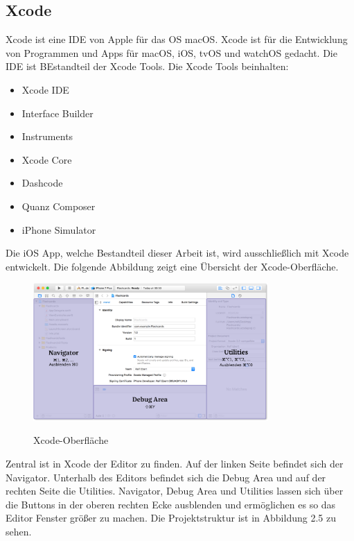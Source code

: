 \subsection{Xcode}
Xcode ist eine \acl{IDE} von Apple für das \acs{OS} macOS. Xcode ist für die Entwicklung von Programmen und Apps für macOS, iOS, tvOS und watchOS gedacht. 
Die \acs{IDE} ist BEstandteil der Xcode Tools. 
\newline
Die Xcode Tools beinhalten:
\begin{itemize}
	\item Xcode \acs{IDE}
	\item Interface Builder
	\item Instruments
	\item Xcode Core
	\item Dashcode
	\item Quanz Composer
	\item iPhone Simulator
\end{itemize}
Die iOS App, welche Bestandteil dieser Arbeit ist, wird ausschließlich mit Xcode entwickelt.
Die folgende Abbildung zeigt eine Übersicht der Xcode-Oberfläche.
\begin{figure}[H]
	\begin{center}
		{\includegraphics[width=0.8\textwidth]{images/xcode_views.png}}
		\caption{Xcode-Oberfläche}
	\end{center}
\end{figure}
Zentral ist in Xcode der Editor zu finden. Auf der linken Seite befindet sich der Navigator. Unterhalb des Editors befindet sich die Debug Area und auf der rechten Seite die Utilities. Navigator, Debug Area und Utilities lassen sich über die Buttons in der oberen rechten Ecke ausblenden und ermöglichen es so das Editor Fenster größer zu machen.
\newline
Die Projektstruktur ist in Abbildung 2.5 zu sehen. 

